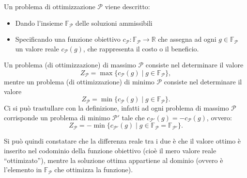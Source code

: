 Un problema di ottimizzazione $\mathcal{P}$ viene descritto:
\begin{itemize}
  \item Dando l’insieme $\mathbb{F}_\mathcal{P}$ delle soluzioni ammissibili
  \item Specificando una funzione obiettivo $c_\mathcal{P} : \mathbb{F}_\mathcal{P} \to \mathbb{R}$ che assegna ad ogni $g \in \mathbb{F}_\mathcal{P}$ un valore reale $c_\mathcal{P}(g)$, che rappresenta il costo o il beneficio.
\end{itemize}
Un problema (di ottimizzazione) di massimo $\mathcal{P}$ consiste nel determinare il valore
\[
Z_\mathcal{P} = \max \{ c_\mathcal{P}(g) \mid g \in \mathbb{F}_\mathcal{P} \},
\]
mentre un problema (di ottimizzazione) di minimo $\mathcal{P}$ consiste nel determinare il valore
\[
Z_\mathcal{P} = \min \{ c_\mathcal{P}(g) \mid g \in \mathbb{F}_\mathcal{P} \}.
\]
Ci si può trastullare con la definizione, infatti ad ogni problema di massimo $\mathcal{P}$ corrisponde un problema di minimo $\mathcal{P}'$ tale che $c_{\mathcal{P}'}(g) = -c_\mathcal{P}(g)$, ovvero:
\[
Z_\mathcal{P} = -\min \{ c_{\mathcal{P}'}(g) \mid g \in \mathbb{F}_\mathcal{P} = \mathbb{F}_{\mathcal{P}'} \}.
\]


Si può quindi constatare che la differenza reale tra i due è che il valore ottimo è inserito nel codominio della funzione obiettivo (cioè il mero valore reale “ottimizato”), mentre la soluzione ottima appartiene al dominio (ovvero è l’elemento in $\mathbb{F}_\mathcal{P}$ che ottimizza la funzione).


